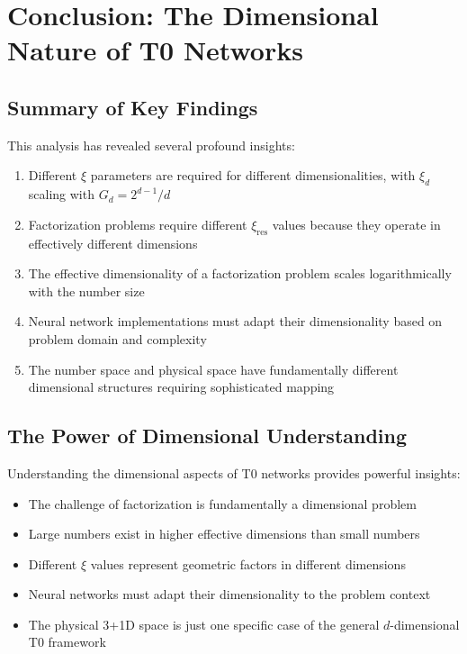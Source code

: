 \documentclass[12pt,a4paper]{article}
\newcommand{\xipar}{\ensuremath{\xi}}
\begin{document}
	\section{Conclusion: The Dimensional Nature of T0 Networks}
	\label{sec:conclusion}
	
	\subsection{Summary of Key Findings}
	\label{subsec:key_findings}
	
	This analysis has revealed several profound insights:
	
	\begin{enumerate}
		\item Different $\xipar$ parameters are required for different dimensionalities, with $\xipar_d$ scaling with $G_d = 2^{d-1}/d$
		\item Factorization problems require different $\xipar_{\text{res}}$ values because they operate in effectively different dimensions
		\item The effective dimensionality of a factorization problem scales logarithmically with the number size
		\item Neural network implementations must adapt their dimensionality based on problem domain and complexity
		\item The number space and physical space have fundamentally different dimensional structures requiring sophisticated mapping
	\end{enumerate}
	
	\subsection{The Power of Dimensional Understanding}
	\label{subsec:dimensional_understanding}
	
	Understanding the dimensional aspects of T0 networks provides powerful insights:
	
	\begin{tcolorbox}[colback=yellow!5!white,colframe=orange!75!black,title=Key Dimensional Insights]
		\begin{itemize}
			\item The challenge of factorization is fundamentally a dimensional problem
			\item Large numbers exist in higher effective dimensions than small numbers
			\item Different $\xipar$ values represent geometric factors in different dimensions
			\item Neural networks must adapt their dimensionality to the problem context
			\item The physical 3+1D space is just one specific case of the general $d$-dimensional T0 framework
		\end{itemize}
	\end{tcolorbox}
	
\end{document}
